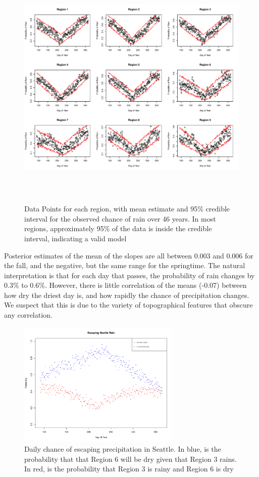 \documentclass{article}
\begin{document}
\begin{figure}
\centering
\includegraphics[width = .8\textwidth, height = 12cm]{AllRegionPosterior}
\caption{Data Points for each region, with mean estimate and 95\% credible interval for the observed chance of rain over 46 years. In most regions, approximately 95\% of the data is inside the credible interval, indicating a valid model}
\label{fig:9by9}
\end{figure}
Posterior estimates of the mean of the slopes are all between 0.003 and 0.006 for the fall, and the negative, but the same range for the springtime. The natural interpretation is that for each day that passes, the probability of rain changes by 0.3\% to 0.6\%. However, there is little correlation of the means (-0.07) between how dry the driest day is, and how rapidly the chance of precipitation changes. We suspect that this is due to the variety of topographical features that obscure any correlation. 

\begin{figure}
\centering
\includegraphics[width = .4\textwidth, height = 6cm]{Model2EscapeSeattleRain}
\caption{Daily chance of escaping precipitation in Seattle. In blue, is the probability that that Region 6 will be dry given that Region 3 rains. In red, is the probability that Region 3 is rainy and Region 6 is dry}
\label{fig:m2EscapeSeattle}
\end{figure}
\end{document}
